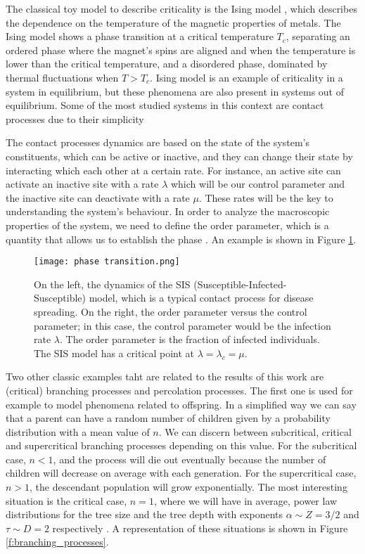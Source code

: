 The classical toy model to describe criticality is the Ising model \cite{ising1925}, which describes the dependence on the temperature of the magnetic properties of metals. The Ising model 
shows a phase transition at a critical temperature $T_c$, separating
an ordered phase where the magnet's spins are aligned and when the temperature is lower than the critical temperature, and a disordered phase,
dominated by thermal fluctuations when $T>T_c$. Ising model is an example of criticality in a system in equilibrium, but these phenomena are also present in systems out of equilibrium. 
Some of the most studied systems in this context are contact processes due to their simplicity

The contact processes dynamics are based on the state of the system's constituents, which can be active or inactive, and they can change their state by interacting which 
each other at a certain rate. For instance, an active site can activate
an inactive site with a rate $\lambda$ which will be our control parameter and the inactive site can deactivate with a rate $\mu$. 
These rates will be the key to understanding the system's behaviour. In order to analyze the macroscopic properties of the system, we need to define the order parameter, 
which is a quantity that allows us to establish the phase \cite{wilting201925}. An example is shown in Figure \ref{f:order_parameter}.

\begin{figure}[H]
    \centering
    \texttt{[image: phase transition.png]}
    \caption{On the left, the dynamics of the SIS (Susceptible-Infected-Susceptible) model, which is a typical contact process for disease spreading. On the right, the order parameter versus 
    the control parameter; in this case, the control parameter would be the infection rate $\lambda$. The order parameter is the fraction of infected individuals. 
    The SIS model has a critical point at $\lambda=\lambda_c=\mu$.}
    \label{f:order_parameter}
\end{figure}

Two other classic examples taht are related to the results of this work are (critical) branching processes and percolation processes. The first one is used for example to model phenomena 
related to offspring. In a simplified way we can say that a parent can have a random number of children given by a probability distribution with a mean value of $n$. We can discern between
subcritical, critical and supercritical branching processes depending on this value. For the subcritical case, $n<1$, and the process will die out eventually because the number of children
will decrease on average with each generation. For the supercritical case, $n>1$, the descendant population will grow exponentially. The most interesting situation is the critical case, $n=1$, 
where we will have in average, power law distributions for the tree size and the tree depth with exponents $\alpha\sim Z=3/2$ and $\tau\sim D=2$ respectively \cite{notarmuzi2021percolation}. A 
representation of these situations is shown in Figure \ref{f:branching_processes}.

